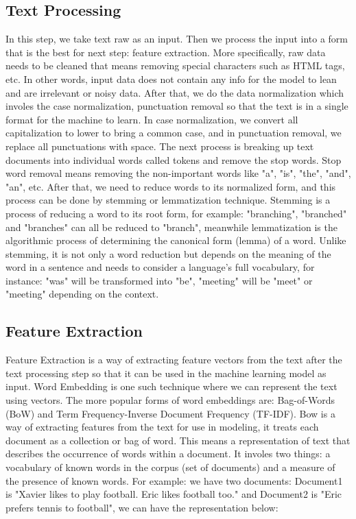 \documentclass[a4paper,12pt]{report}
\begin{document}
    \subsection{Text Processing}
    In this step, we take text raw as an input. Then we process the input into a form that is the best for next step: feature extraction.
    More specifically, raw data needs to be cleaned that means removing special characters such as HTML tags, etc. In other words, input data does not contain any info for the model to lean and are irrelevant or noisy data.
    After that, we do the data normalization which involes the case normalization, punctuation removal so that the text is in a single format for the machine to learn.
    In case normalization, we convert all capitalization to lower to bring a common case, 
    and in punctuation removal, we replace all punctuations with space.
    The next process is breaking up text documents into individual words called tokens and remove the stop words.
    Stop word removal means removing the non-important words like "a", "is", "the", "and", "an", etc. After that, we need to reduce words to its normalized form, and this process can be done by stemming or lemmatization technique.
    Stemming is a process of reducing a word to its root form, for example: "branching", "branched" and "branches" can all be reduced to "branch", 
    meanwhile lemmatization is the algorithmic process of determining the canonical
    form (lemma) of a word.
    Unlike stemming, it is not only a word reduction but depends on the
    meaning of the word in a sentence and needs to consider a language’s
    full vocabulary, for instance: "was" will be transformed into "be", "meeting" will be "meet" or "meeting" depending on the context.

    \subsection{Feature Extraction}
    Feature Extraction is a way of extracting feature vectors from the text after the text processing step so that it can be used in the machine learning model as input.
    Word Embedding is one such technique where we can represent the text using vectors. The more popular forms of word embeddings are:
    Bag-of-Words (BoW) and Term Frequency-Inverse Document Frequency (TF-IDF).
    Bow is a way of extracting features from the text for use in modeling, it treats each document as a collection or bag of word. This means a representation of text that describes the occurrence of words within a document.
    It involes two things: a vocabulary of known words in the corpus (set of documents) and a measure of the presence of known words.
    For example: we have two documents: Document1 is "Xavier likes to play football. Eric likes football too." and Document2 is "Eric prefers tennis to football", we can have the representation below:
\end{document}

